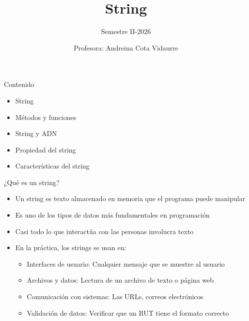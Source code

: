 \documentclass{beamer}
\title{String} %
\subtitle{Semestre II-2026} %
\author{Profesora: Andreina Cota Vidaurre}
\begin{document}
  \shorthandoff{-}
  \frame[c]{\maketitle}


    \begin{frame}{Contenido}
        \begin{itemize}
            \item String
            \item Métodos y funciones
            \item String y ADN
            \item Propiedad del string
            \item Características del string
        \end{itemize}
    \end{frame}

    \begin{frame}{¿Qué es un string?}
        \begin{itemize}
            \item Un string es texto almacenado en memoria que el programa puede manipular
            \item Es uno de los tipos de datos más fundamentales en programación
            \item Casi todo lo que interactúa con las personas involucra texto
            \item En la práctica, los strings se usan en:
            \begin{itemize}
                \item Interfaces de usuario: Cualquier mensaje que se muestre al usuario
                \item Archivos y datos: Lectura de un archivo de texto o página web
                \item Comunicación con sistemas: Las URLs, correos electrónicos
                \item Validación de datos: Verificar que un RUT tiene el formato correcto
            \end{itemize}
        \end{itemize}
    \end{frame}
\end{document}
